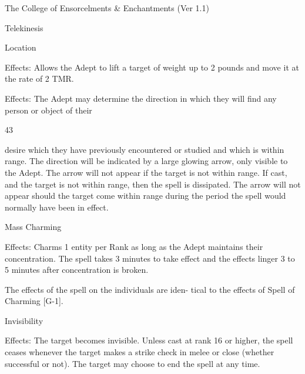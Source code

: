 \begin{Chapter}{The College of Ensorcelments \& Enchantments (Ver 1.1)}
\begin{spell}[G-2]{Telekinesis }

\end{spell}

\begin{spell}[G-6]{Location }

Effects: Allows the Adept to lift a target of weight 
up  to 2 pounds  and  move  it  at the  rate  of  2  TMR. 

Effects: The  Adept may determine the direction in 
which  they  will  find  any  person  or  object  of  their 

43 

desire  which  they  have  previously  encountered  or 
studied  and  which  is  within  range.  The  direction 
will  be  indicated  by  a  large  glowing  arrow,  only 
visible  to  the  Adept.  The  arrow  will  not  appear  if 
the target is not within range. If cast, and the target 
is not within range, then the spell is dissipated. The 
arrow  will  not  appear  should  the  target  come 
within  range  during  the  period  the  spell  would 
normally have been in effect. 

\end{spell}

\begin{spell}[G-7]{Mass Charming }

Effects:  Charms  1  entity  per  Rank  as  long  as  the 
Adept  maintains  their  concentration.  The  spell 
takes 3 minutes to take effect and the effects linger 
3 to 5 minutes after concentration is broken. 

The effects of the spell on the individuals are iden-
tical to the effects of Spell of Charming [G-1]. 

\end{spell}

\begin{spell}[G-8]{Invisibility }

Effects:  The  target  becomes  invisible.  Unless  cast 
at rank 16 or higher, the spell ceases whenever the 
target  makes  a  strike  check  in  melee  or  close 
(whether successful or not). The target may choose 
to end the spell at any time. 


\end{spell}
\end{Chapter}
